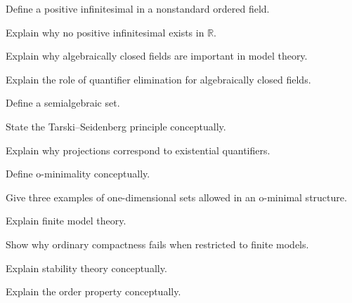 \begin{exercise}[3]
Define a positive infinitesimal in a nonstandard ordered field.
\end{exercise}

\begin{exercise}[3]
Explain why no positive infinitesimal exists in \(\mathbb{R}\).
\end{exercise}

\begin{exercise}[3]
Explain why algebraically closed fields are important in model theory.
\end{exercise}

\begin{exercise}[3]
Explain the role of quantifier elimination for algebraically closed fields.
\end{exercise}

\begin{exercise}[3]
Define a semialgebraic set.
\end{exercise}

\begin{exercise}[3]
State the Tarski--Seidenberg principle conceptually.
\end{exercise}

\begin{exercise}[3]
Explain why projections correspond to existential quantifiers.
\end{exercise}

\begin{exercise}[3]
Define o-minimality conceptually.
\end{exercise}

\begin{exercise}[3]
Give three examples of one-dimensional sets allowed in an o-minimal
structure.
\end{exercise}

\begin{exercise}[3]
Explain finite model theory.
\end{exercise}

\begin{exercise}[3]
Show why ordinary compactness fails when restricted to finite models.
\end{exercise}

\begin{exercise}[3]
Explain stability theory conceptually.
\end{exercise}

\begin{exercise}[3]
Explain the order property conceptually.
\end{exercise}

